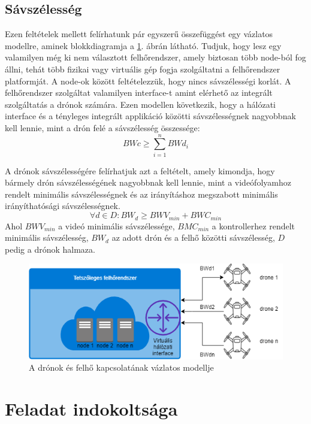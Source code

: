 \subsection{Sávszélesség}
\noindent
Ezen feltételek mellett felírhatunk pár egyszerű összefüggést egy vázlatos modellre, aminek blokkdiagramja a \ref{fig:dronecommunicationtocloud}. ábrán látható. Tudjuk, hogy lesz egy valamilyen még ki nem választott felhőrendszer, amely biztosan több node-ból fog állni, tehát több fizikai vagy virtuális gép fogja szolgáltatni a felhőrendszer platformját. A node-ok között feltételezzük, hogy nincs sávszélességi korlát. A felhőrendszer szolgáltat valamilyen interface-t amint elérhető az integrált szolgáltatás a drónok számára. Ezen modellen következik, hogy a hálózati interface és a tényleges integrált applikáció közötti sávszélességnek nagyobbnak kell lennie, mint a drón felé a sávszélesség összessége:
\begin{equation}
BWc \geq \sum_{i=1}^{n}{BWd_i}
\end{equation}

A drónok sávszélességére felírhatjuk azt a feltételt, amely kimondja, hogy bármely drón sávszélességének nagyobbnak kell lennie, mint a videófolyamhoz rendelt minimális sávszélességnek és az irányításhoz megszabott minimális irányíthatósági sávszélességnek.
\begin{equation}
\forall d \in D: BW_d \geq BWV_{min} + BWC_{min}
\end{equation}
Ahol $BWV_{min}$ a videó minimális sávszélessége, $BMC_{min}$ a kontrollerhez rendelt minimális sávszélesség, $BW_d$ az adott drón és a felhő közötti sávszélesség, $D$ pedig a drónok halmaza.

\begin{figure}
	\centering
	\includegraphics[width=\linewidth]{figures/drone_communication_to_cloud.png}
	\caption{A drónok és felhő kapcsolatának vázlatos modellje}
	\label{fig:dronecommunicationtocloud}
\end{figure}

\section{Feladat indokoltsága}
